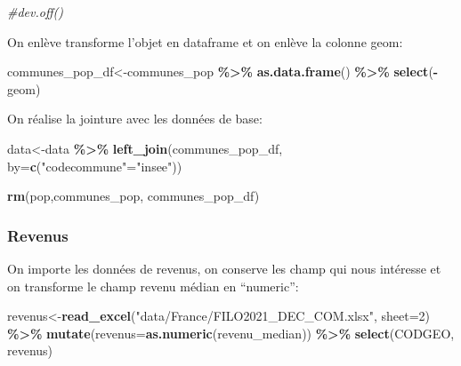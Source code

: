 \documentclass[
]{book}
\newenvironment{Shaded}{\begin{snugshade}}{\end{snugshade}}
\newcommand{\AttributeTok}[1]{\textcolor[rgb]{0.13,0.29,0.53}{#1}}
\newcommand{\CommentTok}[1]{\textcolor[rgb]{0.56,0.35,0.01}{\textit{#1}}}
\newcommand{\DecValTok}[1]{\textcolor[rgb]{0.00,0.00,0.81}{#1}}
\newcommand{\FunctionTok}[1]{\textcolor[rgb]{0.13,0.29,0.53}{\textbf{#1}}}
\newcommand{\NormalTok}[1]{#1}
\newcommand{\OtherTok}[1]{\textcolor[rgb]{0.56,0.35,0.01}{#1}}
\newcommand{\SpecialCharTok}[1]{\textcolor[rgb]{0.81,0.36,0.00}{\textbf{#1}}}
\newcommand{\StringTok}[1]{\textcolor[rgb]{0.31,0.60,0.02}{#1}}
\begin{document}
\begin{Shaded}
\begin{Highlighting}[]
\CommentTok{\#dev.off()}
\end{Highlighting}
\end{Shaded}

On enlève transforme l'objet en dataframe et on enlève la colonne geom:

\begin{Shaded}
\begin{Highlighting}[]
\NormalTok{communes\_pop\_df}\OtherTok{\textless{}{-}}\NormalTok{communes\_pop }\SpecialCharTok{\%\textgreater{}\%}
  \FunctionTok{as.data.frame}\NormalTok{() }\SpecialCharTok{\%\textgreater{}\%}
  \FunctionTok{select}\NormalTok{(}\SpecialCharTok{{-}}\NormalTok{geom)}
\end{Highlighting}
\end{Shaded}

On réalise la jointure avec les données de base:

\begin{Shaded}
\begin{Highlighting}[]
\NormalTok{data}\OtherTok{\textless{}{-}}\NormalTok{data }\SpecialCharTok{\%\textgreater{}\%}
  \FunctionTok{left\_join}\NormalTok{(communes\_pop\_df, }\AttributeTok{by=}\FunctionTok{c}\NormalTok{(}\StringTok{"codecommune"}\OtherTok{=}\StringTok{"insee"}\NormalTok{))}

\FunctionTok{rm}\NormalTok{(pop,communes\_pop, communes\_pop\_df)}
\end{Highlighting}
\end{Shaded}

\hypertarget{revenus}{%
\subsubsection{Revenus}\label{revenus}}

On importe les données de revenus, on conserve les champ qui nous intéresse et on transforme le champ revenu médian en ``numeric'':

\begin{Shaded}
\begin{Highlighting}[]
\NormalTok{revenus}\OtherTok{\textless{}{-}}\FunctionTok{read\_excel}\NormalTok{(}\StringTok{"data/France/FILO2021\_DEC\_COM.xlsx"}\NormalTok{, }\AttributeTok{sheet=}\DecValTok{2}\NormalTok{) }\SpecialCharTok{\%\textgreater{}\%}
  \FunctionTok{mutate}\NormalTok{(}\AttributeTok{revenus=}\FunctionTok{as.numeric}\NormalTok{(revenu\_median)) }\SpecialCharTok{\%\textgreater{}\%}
  \FunctionTok{select}\NormalTok{(CODGEO, revenus)}
\end{Highlighting}
\end{Shaded}
\end{document}
